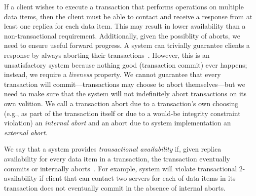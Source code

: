 If a client wishes to execute a transaction that performs operations
on multiple data items, then the client must be able to contact and
receive a response from at least one replica for each data item. This
may result in lower availability than a non-transactional
requirement. Additionally, given the possiblity of aborts, we need to
ensure useful forward progress. A system can trivially guarantee
clients a response by always aborting their
transactions~\cite{transaction-liveness}. However, this is an
unsatisfactory system because nothing good (transaction commit) ever
happens; instead, we require a \textit{liveness} property. We cannot
guarantee that every transaction will commit---transactions may choose
to abort themselves---but we need to make sure that the system will
not indefinitely abort transactions on its own volition. We call a
transaction abort due to a transaction's own choosing (e.g., as part
of the transaction itself or due to a would-be integrity constraint
violation) an \textit{internal abort} and an abort due to system
implementation an \textit{external abort}.

We say that a system provides \textit{transactional availability} if,
given replica availability for every data item in a transaction, the
transaction eventually commits or internally aborts~\cite{hat-hotos}. For example,
system will violate transactional $2$-availability if client that can
contact two servers for each of data items in its transaction does not
eventually commit in the absence of internal aborts.

